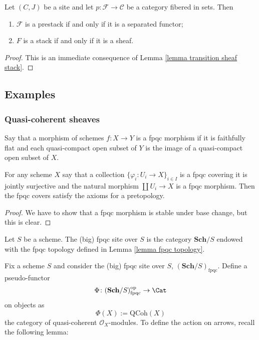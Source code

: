 \begin{prop}
Let $(C,J)$ be a site and let $p \colon \mathcal F \to \mathcal C$ be a category fibered in sets. Then
\begin{enumerate}
\item $\mathcal F$ is a prestack if and only if it is a separated functor;
\item $F$ is a stack if and only if it is a sheaf.
\end{enumerate}
\end{prop}

\begin{proof}
This is an immediate consequence of Lemma \ref{lemma transition sheaf stack}.
\end{proof}

\subsection{Examples}

\subsubsection{Quasi-coherent sheaves}

\begin{defin}
Say that a morphism of schemes $f \colon X \to Y$ is a fpqc morphism if it is faithfully flat and each quasi-compact open subset of $Y$ is the image of a quasi-compact open subset of $X$.
\end{defin}

\begin{lemma} \label{lemma fpqc topology}
For any scheme $X$ say that a collection $\{\varphi_i \colon U_i \to X\}_{i \in I}$ is a fpqc covering it is jointly surjective and the natural morphism $\coprod U_i \to X$ is a fpqc morphism. Then the fpqc covers satisfy the axioms for a pretopology.
\end{lemma}

\begin{proof}
We have to show that a fpqc morphism is stable under base change, but this is clear.
\end{proof}

\begin{defin}
Let $S$ be a scheme. The (big) fpqc site over $S$ is the category $\mathbf{Sch} / S$ endowed with the fpqc topology defined in Lemma \ref{lemma fpqc topology}.
\end{defin}

Fix a scheme $S$ and consider the (big) fpqc site over $S$, $(\mathbf{Sch}/S)_{\mathrm{fpqc}}$. Define a pseudo-functor
\[
\Phi \colon (\mathbf{Sch}/S)_{\mathrm{fpqc}}^{\mathrm{op}} \to \Cat
\]
on objects as
\[
\Phi(X) := \mathrm{QCoh}(X)
\]
the category of quasi-coherent $\mathcal O_X$-modules. To define the action on arrows, recall the following lemma:

